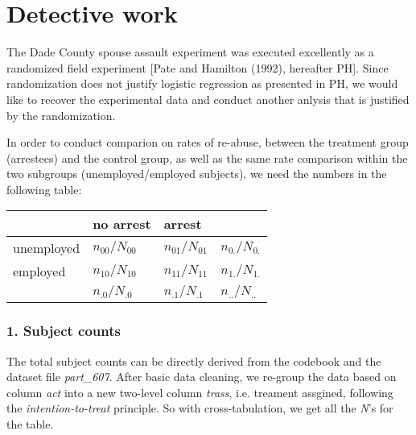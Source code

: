 \documentclass{article}
\begin{document}
\section*{Detective work}

\hspace{12 pt} The Dade County spouse assault experiment was executed
excellently as a randomized field experiment [Pate and Hamilton
(1992), hereafter PH]. Since randomization does not justify logistic
regression as presented in PH, we would like to recover the experimental
data and conduct another anlysis that is justified by the randomization. 


In order to conduct comparion on rates of re-abuse,
between the treatment group (arrestees) and the control
group, as well as the same rate comparison within the two subgroups
(unemployed/employed subjects), we need the numbers in the following table:

\begin{center}
\begin{tabular}{l|l|l|l}
                    & no arrest            & arrest                & \\ \hline
unemployed & {$n_{00}/N_{00}$} & {$n_{01}/N_{01}$} & {$n_{0.}/N_{0.}$}\\ \hline
employed     & {$n_{10}/N_{10}$} & {$n_{11}/N_{11}$} & {$n_{1.}/N_{1.}$}\\ \hline
                    & {$n_{.0}/N_{.0}$}   & {$n_{.1}/N_{.1}$}  & {$n_{..}/N_{..}$}\\ 
\end{tabular}
\end{center}


\subsubsection*{1. Subject counts}
\hspace{12 pt} The total subject counts can be directly derived from the codebook and
the dataset file \textit{part\_607}. After basic data cleaning, we
re-group the data based on column \textit{act} into a new two-level
column \textit{trass}, i.e. treament assgined, following the
\textit{intention-to-treat} principle. So with cross-tabulation, we
get all the \textit{N}'s for the table.

\end{document}
